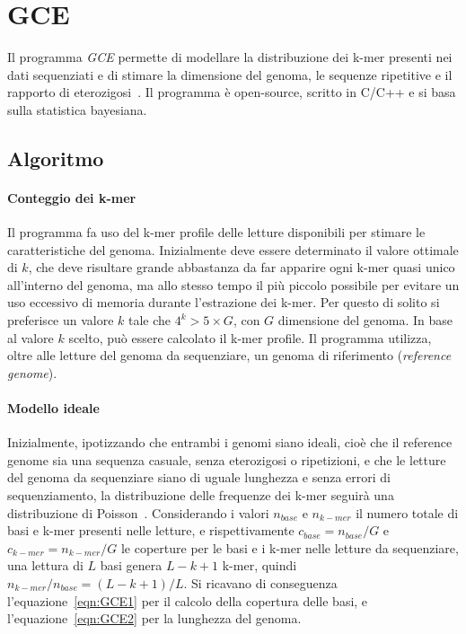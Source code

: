 \documentclass[crop=false, class=book]{standalone}
\begin{document}
	\section{GCE}
	Il programma \textit{GCE} permette di modellare la distribuzione dei k-mer presenti nei dati sequenziati e di stimare la dimensione del genoma, le sequenze ripetitive e il rapporto di eterozigosi~\cite{liu2013GCE}. Il programma è open-source, scritto in C/C++ e si basa sulla statistica bayesiana.
	
	\subsection{Algoritmo}
	\paragraph{Conteggio dei k-mer}
	Il programma fa uso del k-mer profile delle letture disponibili per stimare le caratteristiche del genoma. Inizialmente deve essere determinato il valore ottimale di $k$, che deve risultare grande abbastanza da far apparire ogni k-mer quasi unico all'interno del genoma, ma allo stesso tempo il più piccolo possibile per evitare un uso eccessivo di memoria durante l'estrazione dei k-mer. Per questo di solito si preferisce un valore $k$ tale che $4^k>5 \times G$, con $G$ dimensione del genoma. In base al valore $k$ scelto, può essere calcolato il k-mer profile.
	Il programma utilizza, oltre alle letture del genoma da sequenziare, un genoma di riferimento (\textit{reference genome}).
	
	\paragraph{Modello ideale}
	Inizialmente, ipotizzando che entrambi i genomi siano ideali, cioè che il reference genome sia una sequenza casuale, senza eterozigosi o ripetizioni, e che le letture del genoma da sequenziare siano di uguale lunghezza e senza errori di sequenziamento, la distribuzione delle frequenze dei k-mer seguirà una distribuzione di Poisson~\cite{li2003estimating}. Considerando i valori $n_{base}$ e $n_{k-mer}$ il numero totale di basi e k-mer presenti nelle letture, e rispettivamente $c_{base} = n_{base}/G$ e $c_{k-mer} = n_{k-mer}/G$ le coperture per le basi e i k-mer nelle letture da sequenziare, una lettura di $L$ basi genera $L-k+1$ k-mer, quindi $n_{k-mer} / n_{base} = (L-k+1)/L$. Si ricavano di conseguenza l'equazione~\vref{eqn:GCE1} per il calcolo della copertura delle basi, e l'equazione~\vref{eqn:GCE2} per la lunghezza del genoma.
	
\end{document}
